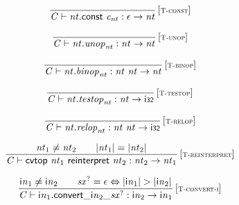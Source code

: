 $$
\begin{array}{@{}c@{}}\displaystyle
\frac{
}{
{\mathit{C}} \vdash {\mathit{nt}}.\mathsf{const}~{\mathit{c}}_{{\mathit{nt}}} : \epsilon \rightarrow {\mathit{nt}}
} \, {[\textsc{\scriptsize T{-}const}]}
\qquad
\end{array}
$$

$$
\begin{array}{@{}c@{}}\displaystyle
\frac{
}{
{\mathit{C}} \vdash {\mathit{nt}} . {\mathit{unop}}_{{\mathit{nt}}} : {\mathit{nt}} \rightarrow {\mathit{nt}}
} \, {[\textsc{\scriptsize T{-}unop}]}
\qquad
\end{array}
$$

$$
\begin{array}{@{}c@{}}\displaystyle
\frac{
}{
{\mathit{C}} \vdash {\mathit{nt}} . {\mathit{binop}}_{{\mathit{nt}}} : {\mathit{nt}}~{\mathit{nt}} \rightarrow {\mathit{nt}}
} \, {[\textsc{\scriptsize T{-}binop}]}
\qquad
\end{array}
$$

$$
\begin{array}{@{}c@{}}\displaystyle
\frac{
}{
{\mathit{C}} \vdash {\mathit{nt}} . {\mathit{testop}}_{{\mathit{nt}}} : {\mathit{nt}} \rightarrow \mathsf{i{\scriptstyle32}}
} \, {[\textsc{\scriptsize T{-}testop}]}
\qquad
\end{array}
$$

$$
\begin{array}{@{}c@{}}\displaystyle
\frac{
}{
{\mathit{C}} \vdash {\mathit{nt}} . {\mathit{relop}}_{{\mathit{nt}}} : {\mathit{nt}}~{\mathit{nt}} \rightarrow \mathsf{i{\scriptstyle32}}
} \, {[\textsc{\scriptsize T{-}relop}]}
\qquad
\end{array}
$$

\vspace{1ex}

$$
\begin{array}{@{}c@{}}\displaystyle
\frac{
{\mathit{nt}}_{{1}} \neq {\mathit{nt}}_{{2}}
 \qquad
{|{\mathit{nt}}_{{1}}|} = {|{\mathit{nt}}_{{2}}|}
}{
{\mathit{C}} \vdash \mathsf{cvtop}~{\mathit{nt}}_{{1}}~\mathsf{reinterpret}~{\mathit{nt}}_{{2}} : {\mathit{nt}}_{{2}} \rightarrow {\mathit{nt}}_{{1}}
} \, {[\textsc{\scriptsize T{-}reinterpret}]}
\qquad
\end{array}
$$

$$
\begin{array}{@{}c@{}}\displaystyle
\frac{
{{\mathsf{i}}{{\mathit{n}}}}_{{1}} \neq {{\mathsf{i}}{{\mathit{n}}}}_{{2}}
 \qquad
{{\mathit{sx}}^?} = \epsilon \Leftrightarrow {|{{\mathsf{i}}{{\mathit{n}}}}_{{1}}|} > {|{{\mathsf{i}}{{\mathit{n}}}}_{{2}}|}
}{
{\mathit{C}} \vdash {{\mathsf{i}}{{\mathit{n}}}}_{{1}} . {{{{\mathsf{convert}}{\mathsf{\_}}}{{{\mathsf{i}}{{\mathit{n}}}}_{{2}}}}{\mathsf{\_}}}{{{\mathit{sx}}^?}} : {{\mathsf{i}}{{\mathit{n}}}}_{{2}} \rightarrow {{\mathsf{i}}{{\mathit{n}}}}_{{1}}
} \, {[\textsc{\scriptsize T{-}convert{-}i}]}
\qquad
\end{array}
$$

